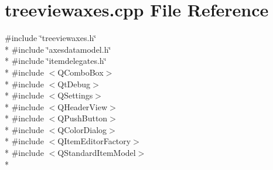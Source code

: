 \section{treeviewaxes.\+cpp File Reference}
\label{treeviewaxes_8cpp}
{\ttfamily \#include \char`\"{}treeviewaxes.\+h\char`\"{}}\\*
{\ttfamily \#include \char`\"{}axesdatamodel.\+h\char`\"{}}\\*
{\ttfamily \#include \char`\"{}itemdelegates.\+h\char`\"{}}\\*
{\ttfamily \#include $<$Q\+Combo\+Box$>$}\\*
{\ttfamily \#include $<$Qt\+Debug$>$}\\*
{\ttfamily \#include $<$Q\+Settings$>$}\\*
{\ttfamily \#include $<$Q\+Header\+View$>$}\\*
{\ttfamily \#include $<$Q\+Push\+Button$>$}\\*
{\ttfamily \#include $<$Q\+Color\+Dialog$>$}\\*
{\ttfamily \#include $<$Q\+Item\+Editor\+Factory$>$}\\*
{\ttfamily \#include $<$Q\+Standard\+Item\+Model$>$}\\*
